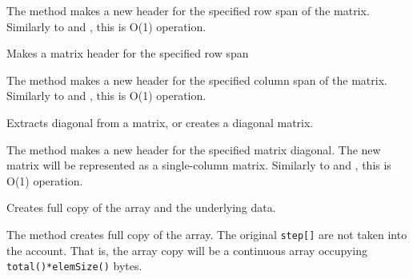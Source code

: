 The method makes a new header for the specified row span of the matrix. Similarly to  and , this is O(1) operation.


Makes a matrix header for the specified row span

\begin{description}
\end{description}

The method makes a new header for the specified column span of the matrix. Similarly to  and , this is O(1) operation.


Extracts diagonal from a matrix, or creates a diagonal matrix.

\begin{description}
\begin{description}
\end{description}
\end{description}

The method makes a new header for the specified matrix diagonal. The new matrix will be represented as a single-column matrix. Similarly to  and , this is O(1) operation.


Creates full copy of the array and the underlying data.


The method creates full copy of the array. The original \texttt{step[]} are not taken into the account. That is, the array copy will be a continuous array occupying \texttt{total()*elemSize()} bytes.

